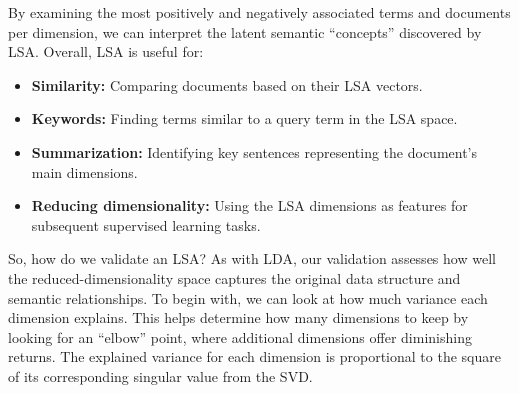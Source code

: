 \documentclass[
]{book}
\newenvironment{Shaded}{\begin{snugshade}}{\end{snugshade}}
\newcommand{\AttributeTok}[1]{\textcolor[rgb]{0.13,0.29,0.53}{#1}}
\newcommand{\CommentTok}[1]{\textcolor[rgb]{0.56,0.35,0.01}{\textit{#1}}}
\newcommand{\DecValTok}[1]{\textcolor[rgb]{0.00,0.00,0.81}{#1}}
\newcommand{\FunctionTok}[1]{\textcolor[rgb]{0.13,0.29,0.53}{\textbf{#1}}}
\newcommand{\NormalTok}[1]{#1}
\newcommand{\OtherTok}[1]{\textcolor[rgb]{0.56,0.35,0.01}{#1}}
\newcommand{\SpecialCharTok}[1]{\textcolor[rgb]{0.81,0.36,0.00}{\textbf{#1}}}
\providecommand{\tightlist}{%
  \setlength{\itemsep}{0pt}\setlength{\parskip}{0pt}}
\begin{document}
By examining the most positively and negatively associated terms and documents per dimension, we can interpret the latent semantic ``concepts'' discovered by LSA. Overall, LSA is useful for:

\begin{itemize}
\tightlist
\item
  \textbf{Similarity:} Comparing documents based on their LSA vectors.
\item
  \textbf{Keywords:} Finding terms similar to a query term in the LSA space.
\item
  \textbf{Summarization:} Identifying key sentences representing the document's main dimensions.
\item
  \textbf{Reducing dimensionality:} Using the LSA dimensions as features for subsequent supervised learning tasks.
\end{itemize}

So, how do we validate an LSA? As with LDA, our validation assesses how well the reduced-dimensionality space captures the original data structure and semantic relationships. To begin with, we can look at how much variance each dimension explains. This helps determine how many dimensions to keep by looking for an ``elbow'' point, where additional dimensions offer diminishing returns. The explained variance for each dimension is proportional to the square of its corresponding singular value from the SVD.

\begin{Shaded}
\end{Shaded}
\end{document}
